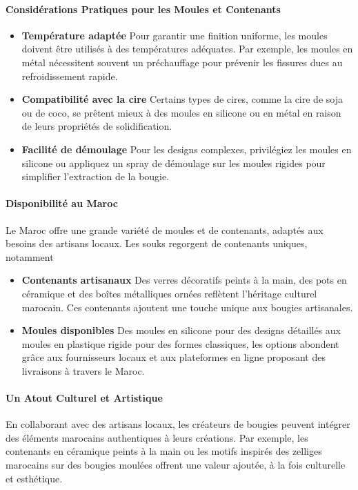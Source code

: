\documentclass[11pt,fleqn,onecolumn,oneside]{book}
\begin{document}
\paragraph{Considérations Pratiques pour les Moules et Contenants}
\begin{itemize}
    \item \textbf{Température adaptée} Pour garantir une finition uniforme, les moules doivent être utilisés à des températures adéquates. Par exemple, les moules en métal nécessitent souvent un préchauffage pour prévenir les fissures dues au refroidissement rapide.
    \item \textbf{Compatibilité avec la cire} Certains types de cires, comme la cire de soja ou de coco, se prêtent mieux à des moules en silicone ou en métal en raison de leurs propriétés de solidification.
    \item \textbf{Facilité de démoulage} Pour les designs complexes, privilégiez les moules en silicone ou appliquez un spray de démoulage sur les moules rigides pour simplifier l’extraction de la bougie.
\end{itemize}

\paragraph{Disponibilité au Maroc}
Le Maroc offre une grande variété de moules et de contenants, adaptés aux besoins des artisans locaux. Les souks regorgent de contenants uniques, notamment
\begin{itemize}
    \item \textbf{Contenants artisanaux} Des verres décoratifs peints à la main, des pots en céramique et des boîtes métalliques ornées reflètent l’héritage culturel marocain. Ces contenants ajoutent une touche unique aux bougies artisanales.
    \item \textbf{Moules disponibles} Des moules en silicone pour des designs détaillés aux moules en plastique rigide pour des formes classiques, les options abondent grâce aux fournisseurs locaux et aux plateformes en ligne proposant des livraisons à travers le Maroc.
\end{itemize}

\paragraph{Un Atout Culturel et Artistique}
En collaborant avec des artisans locaux, les créateurs de bougies peuvent intégrer des éléments marocains authentiques à leurs créations. Par exemple, les contenants en céramique peints à la main ou les motifs inspirés des zelliges marocains sur des bougies moulées offrent une valeur ajoutée, à la fois culturelle et esthétique.
\end{document}
